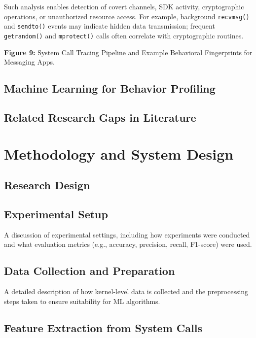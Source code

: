 \documentclass[a4paper,12pt]{report}
\begin{document}
Such analysis enables detection of covert channels, SDK activity, cryptographic operations, or unauthorized resource access. For example, background \texttt{recvmsg()} and \texttt{sendto()} events may indicate hidden data transmission; frequent \texttt{getrandom()} and \texttt{mprotect()} calls often correlate with cryptographic routines.

\textbf{Figure 9:} System Call Tracing Pipeline and Example Behavioral Fingerprints for Messaging Apps.


\section{Machine Learning for Behavior Profiling}

\section{Related Research  Gaps in Literature}

\chapter{Methodology and System Design}

\section{Research Design}

\section{Experimental Setup}
A discussion of experimental settings, including how experiments were conducted and what evaluation metrics (e.g., accuracy, precision, recall, F1-score) were used.



\section{Data Collection and Preparation}
A detailed description of how kernel-level data is collected and the preprocessing steps taken to ensure suitability for ML algorithms.

\section{Feature Extraction from System Calls}
\end{document}
